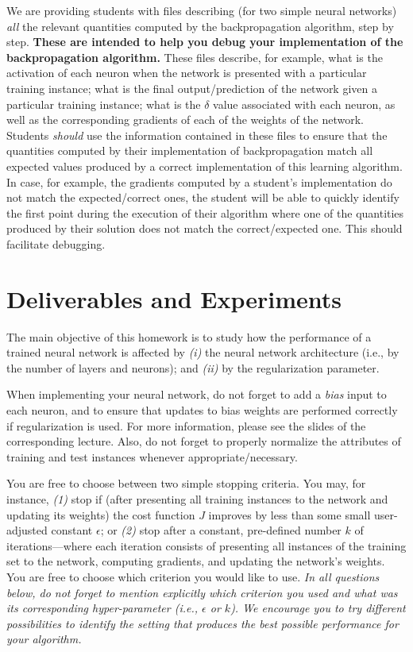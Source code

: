 \documentclass[letterpaper]{article}
\begin{document}
We are providing students with files describing (for two simple neural networks) \textit{all} the relevant quantities computed by the backpropagation algorithm, step by step. \textbf{These are intended to help you debug your implementation of the backpropagation algorithm.} These files describe, for example, what is the activation of each neuron when the network is presented with a particular training instance; what is the final output/prediction of the network given a particular training instance; what is the $\delta$ value associated with each neuron, as well as the corresponding gradients of each of the weights of the network. Students \textit{should} use the information contained in these files to ensure that the quantities computed by their implementation of backpropagation match all expected values produced by a correct implementation of this learning algorithm. In case, for example, the gradients computed by a student's implementation do not match the expected/correct ones, the student will be able to quickly identify the first point during the execution of their algorithm where one of the quantities produced by their solution does not match the correct/expected one. This should facilitate debugging.


\section{Deliverables and Experiments}

The main objective of this homework is to study how the performance of a trained neural network is affected by \textit{(i)} the neural network architecture (i.e., by the number of layers and neurons); and \textit{(ii)} by the regularization parameter. 

When implementing your neural network, do not forget to add a \textit{bias} input to each neuron, and to ensure that updates to bias weights are performed correctly if regularization is used. For more information, please see the slides of the corresponding lecture. Also, do not forget to properly normalize the attributes of training and test instances whenever appropriate/necessary. 

You are free to choose between two simple stopping criteria. You may, for instance, \textit{(1)} stop if (after presenting all training instances to the network and updating its weights) the cost function $J$ improves by less than some small user-adjusted constant $\epsilon$; or  \textit{(2)} stop after a constant, pre-defined number $k$ of iterations---where each iteration consists of presenting all instances of the training set to the network, computing gradients, and updating the network's weights. You are free to choose which criterion you would like to use. \textit{In all questions below, do not forget to mention explicitly which criterion you used and what was its corresponding hyper-parameter (i.e., $\epsilon$ or $k$). We encourage you to try different possibilities to identify the setting that produces the best possible performance for your algorithm.}
\end{document}
